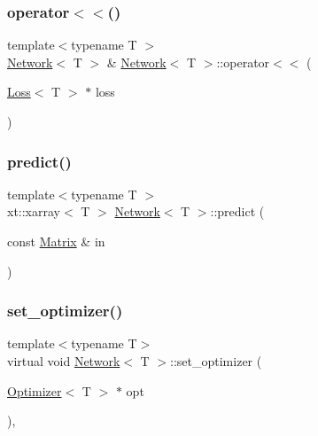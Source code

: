 \mbox{\label{class_network_a79f5d0ee00c5d7dd88a7daa637e6b33d}} 
\subsubsection{\texorpdfstring{operator$<$$<$()}{operator<<()}\hspace{0.1cm}{\footnotesize\ttfamily [4/4]}}
{\footnotesize\ttfamily template$<$typename T $>$ \\
\mbox{\hyperlink{class_network}{Network}}$<$ T $>$ \& \mbox{\hyperlink{class_network}{Network}}$<$ T $>$\+::operator$<$$<$ (\begin{DoxyParamCaption}\item[{\mbox{\hyperlink{class_loss}{Loss}}$<$ T $>$ $\ast$}]{loss }\end{DoxyParamCaption})}

\mbox{\label{class_network_a7359736e7e47ad98b4946b1b719c1c30}} 
\subsubsection{\texorpdfstring{predict()}{predict()}}
{\footnotesize\ttfamily template$<$typename T $>$ \\
xt\+::xarray$<$ T $>$ \mbox{\hyperlink{class_network}{Network}}$<$ T $>$\+::predict (\begin{DoxyParamCaption}\item[{const \mbox{\hyperlink{class_network_a3217727df6a4bde68fb686293258d7f6}{Matrix}} \&}]{in }\end{DoxyParamCaption})\hspace{0.3cm}{\ttfamily [virtual]}}

\mbox{\label{class_network_a1b4d20bb15c3caddb1b648f96d682722}} 
\subsubsection{\texorpdfstring{set\_optimizer()}{set\_optimizer()}}
{\footnotesize\ttfamily template$<$typename T$>$ \\
virtual void \mbox{\hyperlink{class_network}{Network}}$<$ T $>$\+::set\+\_\+optimizer (\begin{DoxyParamCaption}\item[{\mbox{\hyperlink{class_optimizer}{Optimizer}}$<$ T $>$ $\ast$}]{opt }\end{DoxyParamCaption})\hspace{0.3cm}{\ttfamily [inline]}, {\ttfamily [virtual]}}



